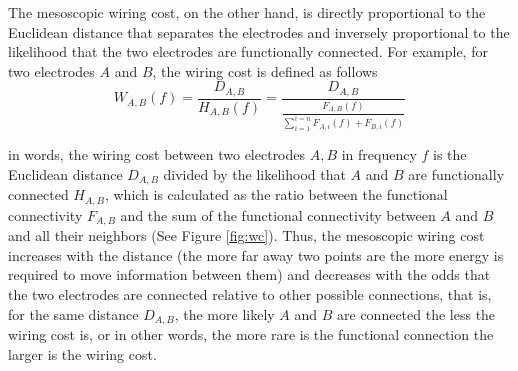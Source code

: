 \documentclass[11pt, onecolumn]{article}
\begin{document}
The mesoscopic wiring cost, on the other hand, is directly proportional to the Euclidean distance that separates the electrodes and inversely proportional to the likelihood that the two electrodes are functionally connected. For example, for two electrodes $A$ and $B$, the wiring cost is defined as follows
\begin{equation}
 W_{A,B}(f) = \frac{D_{A,B}}{H_{A,B}(f)} = \frac{D_{A,B}}{\frac{F_{A,B}(f)}{\sum_{i=1}^{i=n}F_{A,i}(f) + F_{B,i}(f)}}
 \label{eq:mesowc}
\end{equation}

in words, the wiring cost between two electrodes $A,B$ in frequency $f$ is the Euclidean distance $D_{A,B}$ divided by the likelihood that $A$ and $B$ are functionally connected $H_{A,B}$, which is calculated as the ratio between the functional connectivity $F_{A,B}$ and the sum of the functional connectivity between $A$ and $B$ and all their neighbors (See Figure \ref{fig:wc}). Thus, the mesoscopic wiring cost increases with the distance (the more far away two points are the more energy is required to move information between them) and decreases with the odds that the two electrodes are connected relative to other possible connections, that is, for the same distance $D_{A,B}$, the more likely $A$ and $B$ are connected the less the wiring cost is, or in other words, the more rare is the functional connection the larger is the wiring cost. 
\end{document}
